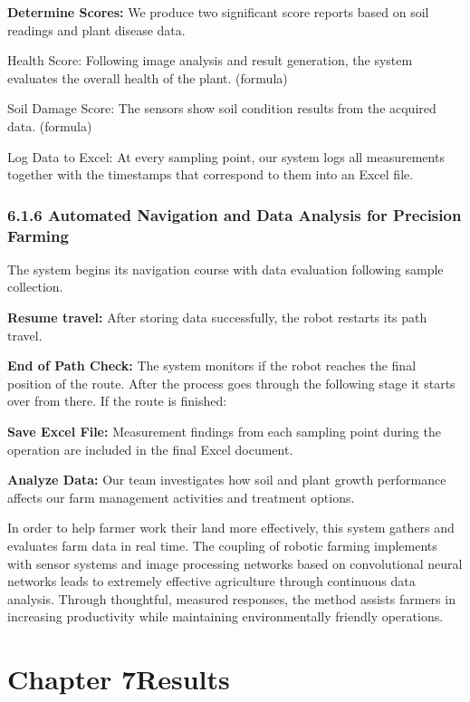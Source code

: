 \documentclass{book} %
\begin{document}
\noindent \textbf{Determine Scores: }We produce two significant score reports based on soil readings and plant disease data.

\noindent Health Score: Following image analysis and result generation, the system evaluates the overall health of the plant. (formula)

\noindent Soil Damage Score: The sensors show soil condition results from the acquired data. (formula)

\noindent Log Data to Excel: At every sampling point, our system logs all measurements together with the timestamps that correspond to them into an Excel file.\textbf{}

\noindent 
\subsection{6.1.6 Automated Navigation and Data Analysis for Precision Farming}

\noindent The system begins its navigation course with data evaluation following sample collection.

\noindent \textbf{Resume travel:} After storing data successfully, the robot restarts its path travel.

\noindent \textbf{End of Path Check:} The system monitors if the robot reaches the final position of the route. After the process goes through the following stage it starts over from there. If the route is finished:

\noindent \textbf{Save Excel File:} Measurement findings from each sampling point during the operation are included in the final Excel document.

\noindent \textbf{Analyze Data:} Our team investigates how soil and plant growth performance affects our farm management activities and treatment options.

\noindent In order to help farmer work their land more effectively, this system gathers and evaluates farm data in real time. The coupling of robotic farming implements with sensor systems and image processing networks based on convolutional neural networks leads to extremely effective agriculture through continuous data analysis. Through thoughtful, measured responses, the method assists farmers in increasing productivity while maintaining environmentally friendly operations.\eject 

\noindent 
\chapter{Chapter 7Results }
\end{document}
